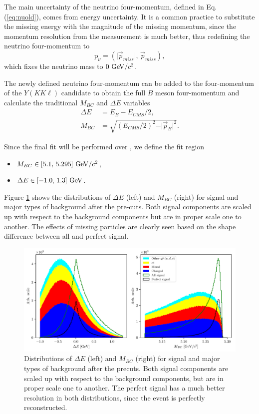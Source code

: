 The main uncertainty of the neutrino four-momentum, defined in Eq. (\ref{eq:nuold}), comes from energy uncertainty. It is a common practice to substitute the missing energy with the magnitude of the missing momentum, since the momentum resolution from the measurement is much better, thus redefining the neutrino four-momentum to
\begin{equation}
\label{eq:nunew}
\mathrm{p}_\nu = \left(\vert \vec{p}_{miss} \vert,\,\vec{p}_{miss} \right),
\end{equation}
which fixes the neutrino mass to $0\mathrm{~GeV}/c^2$.

The newly defined neutrino four-momentum can be added to the four-momentum of the $Y(KK\ell)$ candidate to obtain the full $B$ meson four-momentum and calculate the traditional $M_{BC}$ and $\Delta E$ variables
\begin{align}
\label{eq:de}
\Delta E &= E_B - E_{CMS}/2,\\
M_{BC} &= \sqrt{\left(E_{CMS}/2\right)^2 - \vert \vec{p}_B \vert^2}.
\end{align}

Since the final fit will be performed over \vars, we define the fit region
\begin{itemize}
	\item $M_{BC} \in [5.1,\,5.295]\mathrm{~GeV}/c^2$,
	\item $\Delta E \in [-1.0,\,1.3]\mathrm{~GeV}$.
\end{itemize}

Figure \ref{fig:mbc_de_pre} shows the distributions of $\Delta E$ (left) and $M_{BC}$ (right) for signal and major types of background after the pre-cuts. Both signal components are scaled up with respect to the background components but are in proper scale one to another. The effects of missing particles are clearly seen based on the shape difference between all and perfect signal.

\begin{figure}[H]
	\centering
	\captionsetup{width=0.8\linewidth}
	\includegraphics[width=\linewidth]{fig/mbc_de_pre}
	\caption{Distributions of $\Delta E$ (left) and $M_{BC}$ (right) for signal and major types of background after the precuts. Both signal components are scaled up with respect to the background components, but are in proper scale one to another. The perfect signal has a much better resolution in both distributions, since the event is perfectly reconstructed.}
	\label{fig:mbc_de_pre}
\end{figure}

